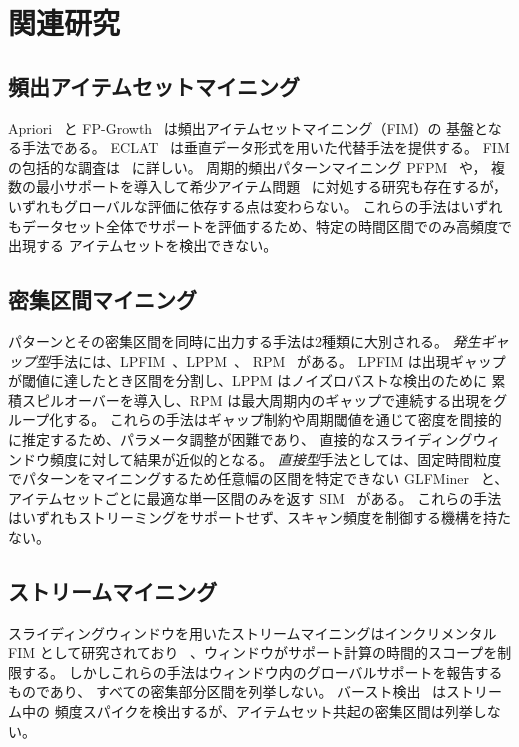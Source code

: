\section{関連研究}

\subsection{頻出アイテムセットマイニング}

Apriori~\cite{agrawal1994fast} と FP-Growth~\cite{han2000mining} は頻出アイテムセットマイニング（FIM）の
基盤となる手法である。
ECLAT~\cite{zaki1997new} は垂直データ形式を用いた代替手法を提供する。
FIM の包括的な調査は~\cite{fournier2017survey,luna2019fim,fournierviger2022survey} に詳しい。
周期的頻出パターンマイニング PFPM~\cite{tanbeer2009pfpm} や，
複数の最小サポートを導入して希少アイテム問題~\cite{liu1999multiple} に対処する研究も存在するが，
いずれもグローバルな評価に依存する点は変わらない。
これらの手法はいずれもデータセット全体でサポートを評価するため、特定の時間区間でのみ高頻度で出現する
アイテムセットを検出できない。

\subsection{密集区間マイニング}

パターンとその密集区間を同時に出力する手法は2種類に大別される。
\textit{発生ギャップ型}手法には、LPFIM~\cite{yin2014lpfim}、LPPM~\cite{saleh2011lppm}、
RPM~\cite{kiran2017rpm} がある。
LPFIM は出現ギャップが閾値に達したとき区間を分割し、LPPM はノイズロバストな検出のために
累積スピルオーバーを導入し、RPM は最大周期内のギャップで連続する出現をグループ化する。
これらの手法はギャップ制約や周期閾値を通じて密度を間接的に推定するため、パラメータ調整が困難であり、
直接的なスライディングウィンドウ頻度に対して結果が近似的となる。
\textit{直接型}手法としては、固定時間粒度でパターンをマイニングするため任意幅の区間を特定できない
GLFMiner~\cite{fournierviger2021glf} と、アイテムセットごとに最適な単一区間のみを返す
SIM~\cite{kiran2015sim} がある。
これらの手法はいずれもストリーミングをサポートせず、スキャン頻度を制御する機構を持たない。

\subsection{ストリームマイニング}

スライディングウィンドウを用いたストリームマイニングはインクリメンタルFIM として研究されており
~\cite{lee2001sliding,leung2006dstree}、ウィンドウがサポート計算の時間的スコープを制限する。
しかしこれらの手法はウィンドウ内のグローバルサポートを報告するものであり、
すべての密集部分区間を列挙しない。
バースト検出~\cite{kleinberg2003bursty,yang2021burstsketch} はストリーム中の
頻度スパイクを検出するが、アイテムセット共起の密集区間は列挙しない。

